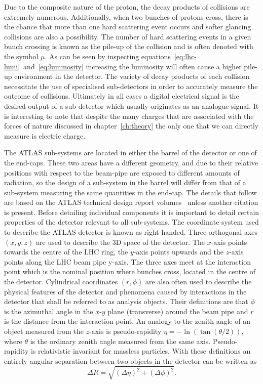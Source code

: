 Due to the composite nature of the proton, the decay products of collisions are
extremely numerous. Additionally, when two bunches of protons cross, there is the
chance that more than one hard scattering event occurs and softer glancing
collisions are also a possibility. The number of hard scattering events in a
given bunch crossing is known as the pile-up of the collision and is often
denoted with the symbol $\mu$. As can be seen by inspecting
equations~\ref{eq:lhc-lumi}~and~\ref{eq:luminosity} increasing the luminosity
will often cause a higher pile-up environment in the detector. The variety of
decay products of each collision necessitate the use of specialised
sub-detectors in order to accurately measure the outcome of collisions.
Ultimately in all cases a digital electrical signal is the desired output of a
sub-detector which usually originates as an analogue signal. It is interesting
to note that despite the many charges that are associated with the forces of
nature discussed in chapter~\ref{ch:theory} the only one that we can directly
measure is electric charge.

The ATLAS sub-systems are located in either the barrel of the detector or one of
the end-caps. These two areas have a different geometry, and due to their
relative positions with respect to the beam-pipe are exposed to different
amounts of radiation, so the design of a sub-system in the barrel will differ
from that of a sub-system measuring the same quantities in the end-cap. The
details that follow are based on the ATLAS technical design report
volumes~\cite{ATLAS-TDR-01, ATLAS-TDR-02} unless another citation is present.
Before detailing individual components it is important to detail certain
properties of the detector relevant to all sub-systems.  The coordinate system
used to describe the ATLAS detector is known as right-handed. Three orthogonal
axes $(x, y, z)$ are used to describe the 3D space of the detector. The $x$-axis
points towards the centre of the LHC ring, the $y$-axis points upwards and the
$z$-axis points along the LHC beam pipe y-axis. The three axes meet at the
interaction point which is the nominal position where bunches cross, located in
the centre of the detector. Cylindrical coordinates $(r, \phi)$ are also often
used to describe the physical features of the detector and phenomena caused by
interactions in the detector that shall be referred to as analysis objects.
Their definitions are that $\phi$ is the azimuthal angle in the $x$-$y$ plane
(transverse) around the beam pipe and $r$ is the distance from the interaction
point. An analogy to the zenith angle of an object measured from the $z$-axis is
pseudo-rapidity $\eta = - \ln(\tan(\theta / 2))$, where $\theta$ is the ordinary
zenith angle measured from the same axis. Pseudo-rapidity is relativistic
invariant for massless particles. With these definitions an entirely angular
separation between two objects in the detector can be written as
\begin{equation}
  \Delta R = \sqrt{(\Delta \eta)^2 + (\Delta \phi)^2}.
\end{equation}

